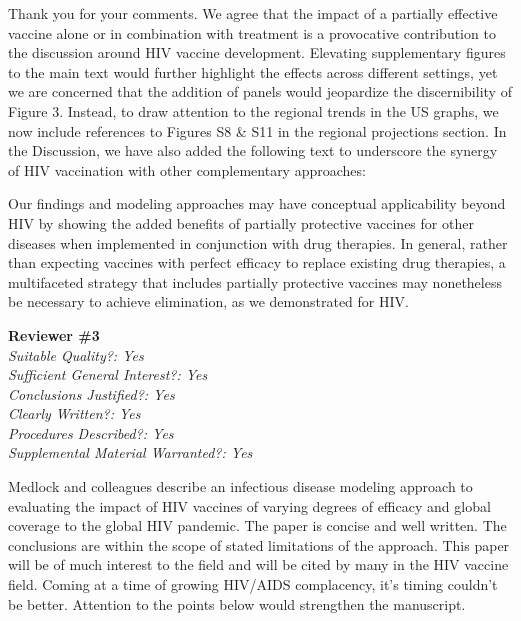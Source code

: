 \documentclass[12pt]{jpmletter}
\newcommand{\section}[1]{\textbf{#1}\\}
\newenvironment{original}{\it}{}
\begin{document}
\begin{letter}{}
    Thank you for your comments. We agree that the impact of a
    partially effective vaccine alone or in combination with treatment
    is a provocative contribution to the discussion around HIV vaccine
    development. Elevating supplementary figures to the main text
    would further highlight the effects across different settings, yet
    we are concerned that the addition of panels would jeopardize the
    discernibility of Figure 3. Instead, to draw attention to the
    regional trends in the US graphs, we now include references to
    Figures S8 \& S11 in the regional projections section. In the
    Discussion, we have also added the following text to underscore
    the synergy of HIV vaccination with other complementary
    approaches:
    \begin{quoting}
      Our findings and modeling approaches may have conceptual
      applicability beyond HIV by showing the added benefits of
      partially protective vaccines for other diseases when
      implemented in conjunction with drug therapies. In general,
      rather than expecting vaccines with perfect efficacy to replace
      existing drug therapies, a multifaceted strategy that includes
      partially protective vaccines may nonetheless be necessary to
      achieve elimination, as we demonstrated for HIV.
    \end{quoting}

    \section{Reviewer \#3}
    \begin{original}
      Suitable Quality?: Yes\\
      Sufficient General Interest?: Yes\\
      Conclusions Justified?: Yes\\
      Clearly Written?: Yes\\
      Procedures Described?: Yes\\
      Supplemental Material Warranted?: Yes

      Medlock and colleagues describe an infectious disease modeling
      approach to evaluating the impact of HIV vaccines of varying
      degrees of efficacy and global coverage to the global HIV
      pandemic. The paper is concise and well written. The conclusions
      are within the scope of stated limitations of the approach. This
      paper will be of much interest to the field and will be cited by
      many in the HIV vaccine field. Coming at a time of growing
      HIV/AIDS complacency, it's timing couldn't be better. Attention
      to the points below would strengthen the manuscript.


\end{original}
\end{letter}
\end{document}
